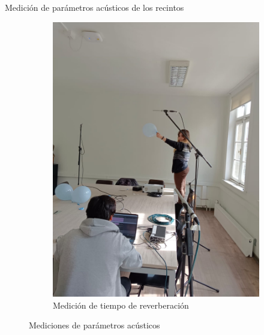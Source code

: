 \documentclass{sintefbeamer}
\begin{document}
\begin{frame}{Medición de parámetros acústicos de los recintos}
\begin{figure}[h!]
\begin{subfigure}[b]{0.15\linewidth}
            \includegraphics[width=\linewidth]{images/Fotos Mediciones/medicionRT.jpeg}
            \caption{Medición de tiempo de reverberación}
            \label{fig: medicion rt}
        \end{subfigure}
        \caption{Mediciones de parámetros acústicos}
        \label{fig:mediciones}
    \end{figure}

\end{frame}
\end{document}
